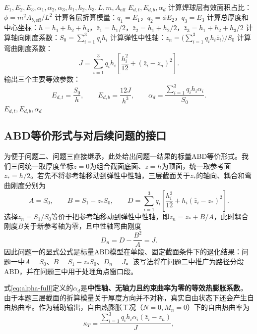 \documentclass[draft,12pt,a4paper]{ctexart}
\theoremstyle{definition}
\begin{document}
\begin{algorithm}[H]
\caption{问题一等效参数计算流程}\label{alg:q1}
\begin{algorithmic}[1]
\Require $E_1,E_2,E_3,\alpha_1,\alpha_2,\alpha_3,h_1,h_2,h_3,L,m,A_{\mathrm{eff}}$
\Ensure $E_{d,t},E_{d,b},\alpha_d$
\State 计算焊球层有效面积占比：$\phi = m^2 A_{b,\mathrm{eff}}/L^2$
\State 计算各层折算模量：$q_1 = E_1$，$q_2 = \phi E_2$，$q_3 = E_3$
\State 计算总厚度和中心坐标：$h = h_1+h_2+h_3$，$\bar{z}_1 = h_1/2$，$\bar{z}_2 = h_1+h_2/2$，$\bar{z}_3 = h_1+h_2+h_3/2$
\State 计算轴向刚度系数：$S_0 = \sum_{i=1}^{3}q_i h_i$
\State 计算弹性中性轴：$z_n = \bigl(\sum_{i=1}^{3}q_i h_i\bar{z}_i\bigr)/S_0$
\State 计算弯曲刚度系数：
\[
J=\sum_{i=1}^{3}q_i h_i
\left[\frac{h_i^2}{12}+(\bar{z}_i-z_n)^2\right].
\]
\State 输出三个主要等效参数：
\[
E_{d,t}=\frac{S_0}{h},\qquad
E_{d,b}=\frac{12J}{h^3},\qquad
\alpha_d=\frac{\sum_{i=1}^{3}q_i h_i\alpha_i}{S_0}.
\]
\State \Return $E_{d,t},E_{d,b},\alpha_d$
\end{algorithmic}
\end{algorithm}


\subsection{ABD等价形式与对后续问题的接口}

为便于问题二、问题三直接继承，此处给出问题一结果的标量ABD等价形式。我们三问统一取厚度坐标$z=0$为组合截面底面、$z=h$为顶面，统一取参考面$z_*=h/2$。若先不将参考轴移动到弹性中性轴，三层截面关于$z_*$的轴向、耦合和弯曲刚度分别为
\begin{equation}\label{eq:q1-abd}
A=S_0,\qquad
B=S_1-z_*S_0,\qquad
D=\sum_{i=1}^{3}q_i\left[\frac{h_i^3}{12}+h_i(\bar z_i-z_*)^2\right].
\end{equation}
选择$z_n=S_1/S_0$等价于把参考轴移动到弹性中性轴，即$z_n=z_*+B/A$，此时耦合刚度$B$关于新参考轴为零，且中性轴弯曲刚度
\begin{equation}\label{eq:q1-dn}
D_n=D-\frac{B^2}{A}=J.
\end{equation}
因此问题一的显式公式是标量ABD模型在单段、固定截面条件下的退化结果：问题一中$A=S_0$、$B=S_1-z_*S_0$、$D_n=J$。该写法将在问题二中推广为路径分段ABD，并在问题三中用于处理角点窗口段。

式\eqref{eq:alpha-full}定义的$\alpha_d$是\textbf{中性轴、无轴力且约束曲率为零的等效热膨胀系数}。由于本题三层截面的折算模量关于厚度方向并不对称，真实自由状态下还会产生自由热曲率。作为辅助输出，自由热膨胀工况（$N=0,M_n=0$）下的自由热曲率为
\begin{equation}\label{eq:q1-kappaT}
\kappa_T
=\frac{\sum_{i=1}^{3}q_ih_i\alpha_i(\bar z_i-z_n)}{J},
\end{equation}
\end{document}
